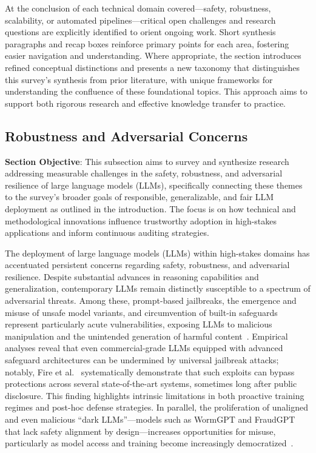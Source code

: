 \documentclass[sigconf]{acmart}
\begin{document}
At the conclusion of each technical domain covered—safety, robustness, scalability, or automated pipelines—critical open challenges and research questions are explicitly identified to orient ongoing work. Short synthesis paragraphs and recap boxes reinforce primary points for each area, fostering easier navigation and understanding. Where appropriate, the section introduces refined conceptual distinctions and presents a new taxonomy that distinguishes this survey's synthesis from prior literature, with unique frameworks for understanding the confluence of these foundational topics. This approach aims to support both rigorous research and effective knowledge transfer to practice.

\subsection{Robustness and Adversarial Concerns}

\textbf{Section Objective}: This subsection aims to survey and synthesize research addressing measurable challenges in the safety, robustness, and adversarial resilience of large language models (LLMs), specifically connecting these themes to the survey's broader goals of responsible, generalizable, and fair LLM deployment as outlined in the introduction. The focus is on how technical and methodological innovations influence trustworthy adoption in high-stakes applications and inform continuous auditing strategies.

The deployment of large language models (LLMs) within high-stakes domains has accentuated persistent concerns regarding safety, robustness, and adversarial resilience. Despite substantial advances in reasoning capabilities and generalization, contemporary LLMs remain distinctly susceptible to a spectrum of adversarial threats. Among these, prompt-based jailbreaks, the emergence and misuse of unsafe model variants, and circumvention of built-in safeguards represent particularly acute vulnerabilities, exposing LLMs to malicious manipulation and the unintended generation of harmful content~\cite{ref78,ref82}. Empirical analyses reveal that even commercial-grade LLMs equipped with advanced safeguard architectures can be undermined by universal jailbreak attacks; notably, Fire et al.~\cite{ref82} systematically demonstrate that such exploits can bypass protections across several state-of-the-art systems, sometimes long after public disclosure. This finding highlights intrinsic limitations in both proactive training regimes and post-hoc defense strategies. In parallel, the proliferation of unaligned and even malicious ``dark LLMs''---models such as WormGPT and FraudGPT that lack safety alignment by design---increases opportunities for misuse, particularly as model access and training become increasingly democratized~\cite{ref82,ref78}.
\end{document}
